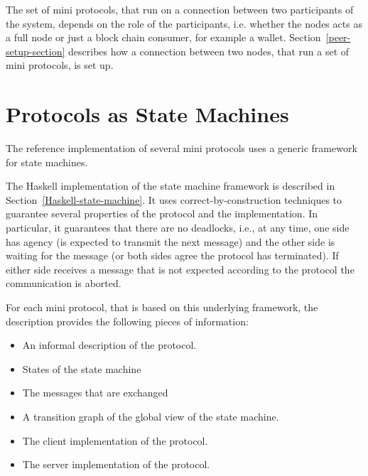 \documentclass{report}
\theoremstyle{definition}{
  \newtheorem{lemma}{Lemma}[section] %
  \newtheorem{definition}[lemma]{Definition}
}
\theoremstyle{theorem}{
  \newtheorem{invariant}[lemma]{Invariant}
  \newtheorem{proofobligation}[lemma]{Proof Obligation}
}
\numberwithin{equation}{lemma}
\begin{document}
The set of mini protocols, that run on a connection between two participants of the system,
depends on the role of the participants, i.e. whether the nodes acts as a full node or just
a block chain consumer, for example a wallet.
Section~\ref{peer-setup-section} describes how a connection between two nodes,
that run a set of mini protocols, is set up.

\section{Protocols as State Machines}
The reference implementation of several mini protocols uses a generic framework
for state machines.

The Haskell implementation of the state machine framework is described in
Section~\ref{Haskell-state-machine}. It uses correct-by-construction
techniques to guarantee
several properties of the protocol and the implementation.
In particular, it guarantees that there are no deadlocks, i.e., at any time, one side has agency
(is expected to transmit the next message) and the other side is waiting for the message (or both sides agree the protocol has terminated).
If either side receives a message that is not expected according to the protocol
the communication is aborted.

For each mini protocol, that is based on this underlying framework, the description provides the
following pieces of information:

\begin{itemize}
\item An informal description of the protocol.
\item States of the state machine
\item The messages that are exchanged
\item A transition graph of the global view of the state machine.
\item The client implementation of the protocol.
\item The server implementation of the protocol.
\end{itemize}
\end{document}
